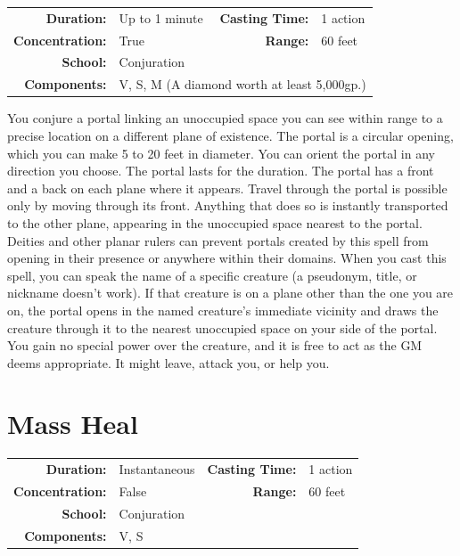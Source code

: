 \documentclass[12pt,showtrims]{memoir}
\begin{document}
{
\small\centering\vspace{-6pt}
\begin{tabular}{rlrl}
\toprule

\textbf{Duration:} & Up to 1 minute &
\textbf{Casting Time:} & 1 action \\
\textbf{Concentration:} & True &
\textbf{Range:} & 60 feet \\
\textbf{School:} & Conjuration \\
\textbf{Components:} & \multicolumn{3}{p{0.7\textwidth}}{V, S, M (A diamond worth at least 5,000gp.)}\\

\bottomrule
\end{tabular}
}

\vspace{1\baselineskip}\noindent You conjure a portal linking an unoccupied space you can see within range to a precise location on a different plane of existence. The portal is a circular opening, which you can make 5 to 20 feet in diameter. You can orient the portal in any direction you choose. The portal lasts for the duration. The portal has a front and a back on each plane where it appears. Travel through the portal is possible only by moving through its front. Anything that does so is instantly transported to the other plane, appearing in the unoccupied space nearest to the portal. Deities and other planar rulers can prevent portals created by this spell from opening in their presence or anywhere within their domains. When you cast this spell, you can speak the name of a specific creature (a pseudonym, title, or nickname doesn't work). If that creature is on a plane other than the one you are on, the portal opens in the named creature's immediate vicinity and draws the creature through it to the nearest unoccupied space on your side of the portal. You gain no special power over the creature, and it is free to act as the GM deems appropriate. It might leave, attack you, or help you.

\newpage
\section*{Mass Heal}

{
\small\centering\vspace{-6pt}
\begin{tabular}{rlrl}
\toprule

\textbf{Duration:} & Instantaneous &
\textbf{Casting Time:} & 1 action \\
\textbf{Concentration:} & False &
\textbf{Range:} & 60 feet \\
\textbf{School:} & Conjuration \\
\textbf{Components:} & \multicolumn{3}{p{0.7\textwidth}}{V, S}\\

\bottomrule
\end{tabular}
}
\end{document}
